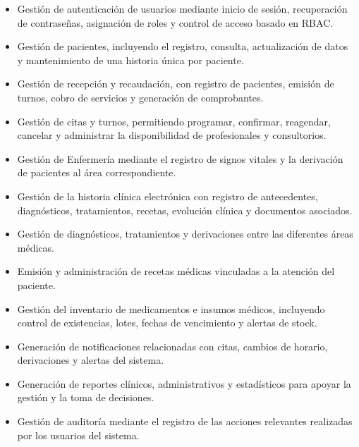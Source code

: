 \documentclass[11pt,a4paper]{article}
\begin{document}
	\begin{itemize}
		\item Gestión de autenticación de usuarios mediante inicio de sesión, recuperación de contraseñas, asignación de roles y control de acceso basado en RBAC.
		
		\item Gestión de pacientes, incluyendo el registro, consulta, actualización de datos y mantenimiento de una historia única por paciente.
		
		\item Gestión de recepción y recaudación, con registro de pacientes, emisión de turnos, cobro de servicios y generación de comprobantes.
		
		\item Gestión de citas y turnos, permitiendo programar, confirmar, reagendar, cancelar y administrar la disponibilidad de profesionales y consultorios.
		
		\item Gestión de Enfermería mediante el registro de signos vitales y la derivación de pacientes al área correspondiente.
		
		\item Gestión de la historia clínica electrónica con registro de antecedentes, diagnósticos, tratamientos, recetas, evolución clínica y documentos asociados.
		
		\item Gestión de diagnósticos, tratamientos y derivaciones entre las diferentes áreas médicas.
		
		\item Emisión y administración de recetas médicas vinculadas a la atención del paciente.
		
		\item Gestión del inventario de medicamentos e insumos médicos, incluyendo control de existencias, lotes, fechas de vencimiento y alertas de stock.
		
		\item Generación de notificaciones relacionadas con citas, cambios de horario, derivaciones y alertas del sistema.
		
		\item Generación de reportes clínicos, administrativos y estadísticos para apoyar la gestión y la toma de decisiones.
		
		\item Gestión de auditoría mediante el registro de las acciones relevantes realizadas por los usuarios del sistema.
	\end{itemize}
	
\end{document}
